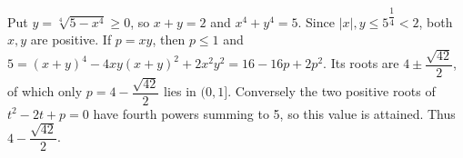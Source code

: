 Put $ y=\sqrt[4]{5-x^4}\ge0 $, so $ x+y=2 $ and $ x^4+y^4=5 $. Since $|x|,y\le5^{\dfrac{1}{4}}<2 $, both $ x,y $ are positive. If $ p=xy $, then $ p\le1 $ and $ 5=(x+y)^4-4xy(x+y)^2+2x^2y^2=16-16p+2p^2 $. Its roots are $ 4\pm\dfrac{\sqrt{42}}{2}$, of which only $ p=4-\dfrac{\sqrt{42}}{2}$ lies in $(0,1]$. Conversely the two positive roots of $ t^2-2t+p=0 $ have fourth powers summing to 5, so this value is attained. Thus $\boxed{4-\dfrac{\sqrt{42}}{2}}$.
